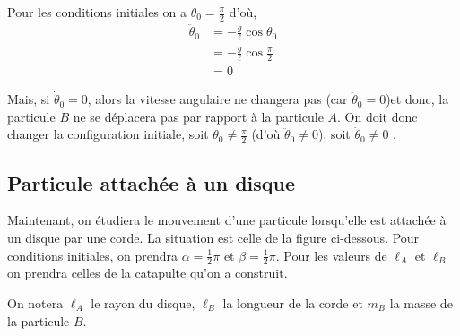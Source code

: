 \documentclass[10pt]{article}
\begin{document}
Pour les conditions initiales on a $\theta_0 = \frac{\pi}{2}$ d'où,
\begin{align*}
\ddot{\theta}_0 &= -\frac{g}{\ell}\cos{\theta_0}  \\
&= -\frac{g}{\ell}\cos{\frac{\pi}{2}} \\
&= 0
\end{align*}

Mais, si $\dot{\theta}_0 = 0$,  alors la vitesse angulaire ne changera pas (car $\ddot{\theta}_0 = 0$)et donc, la particule $B$ ne se déplacera pas par rapport à la particule $A$. On doit donc changer la configuration initiale, soit $\theta_0 \neq \frac{\pi}{2}$ (d'où $\ddot{\theta}_0 \neq 0$), soit $\dot{\theta}_0 \neq 0$ .

\subsection{Particule attachée à un disque}


Maintenant, on étudiera le mouvement d'une particule lorsqu'elle est attachée à un disque par une corde. La situation est celle de la figure ci-dessous. Pour conditions initiales, on prendra $\alpha = \frac12\pi$ et $\beta = \frac12\pi$.
Pour les valeurs de $\ell_A$ et $\ell_B$ on prendra celles de la catapulte qu'on a construit.
\begin{center}


\end{center}
On notera $\ell_A$ le rayon du disque, $\ell_B$ la longueur de la corde et $m_B$ la masse de la particule $B$.
\end{document}

